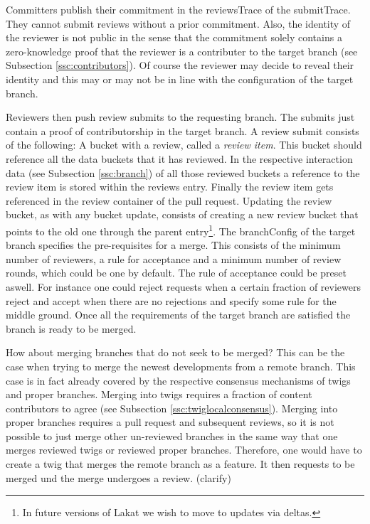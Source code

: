 \documentclass[14pt]{article}
\newcommand{\remark}[1]{{\color{purple} (#1)}}
\begin{document}
Committers publish their commitment in the reviewsTrace of the submitTrace. They cannot submit reviews without a prior commitment. Also, the identity of the reviewer is not public in the sense that the commitment solely contains a zero-knowledge proof that the reviewer is a contributer to the target branch (see Subsection \ref{ssc:contributors}).
Of course the reviewer may decide to reveal their identity and this may or may not be in line with the configuration of the target branch.

Reviewers then push review submits to the requesting branch. The submits just contain a proof of contributorship in the target branch. A review submit consists of the following: A bucket with a review, called a \textit{review item}. This bucket should reference all the data buckets that it has reviewed. In the respective interaction data (see Subsection \ref{ssc:branch}) of all those reviewed buckets a reference to the review item is stored within the reviews entry. Finally the review item gets referenced in the review container of the pull request. Updating the review bucket, as with any bucket update, consists of creating a new review bucket that points to the old one through the parent entry\footnote{In future versions of Lakat we wish to move to updates via deltas.}. The branchConfig of the target branch specifies the pre-requisites for a merge. This consists of the minimum number of reviewers, a rule for acceptance and a minimum number of review rounds, which could be one by default. The rule of acceptance could be preset aswell. For instance one could reject requests when a certain fraction of reviewers reject and accept when there are no rejections and specify some rule for the middle ground. Once all the requirements of the target branch are satisfied the branch is ready to be merged. 

How about merging branches that do not seek to be merged? This can be the case when trying to merge the newest developments from a remote branch. This case is in fact already covered by the respective consensus mechanisms of twigs and proper branches. Merging into twigs requires a fraction of content contributors to agree (see Subsection \ref{ssc:twiglocalconsensus}). Merging into proper branches requires a pull request and subsequent reviews, so it is not possible to just merge other un-reviewed branches in the same way that one merges reviewed twigs or reviewed proper branches. Therefore, one would have to create a twig that merges the remote branch as a feature. It then requests to be merged und the merge undergoes a review. \remark{clarify}
\end{document}
